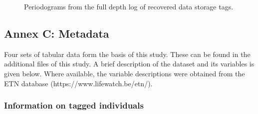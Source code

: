 \documentclass[
  authoryear,
  review,
  3p]{elsarticle}
\begin{document}
\begin{figure}

\begin{minipage}[t]{\linewidth}

{\centering 


}

\end{minipage}%
\newline
\begin{minipage}[t]{\linewidth}

{\centering 


}

\end{minipage}%

\caption{\label{fig-fft}Periodograms from the full depth log of
recovered data storage tags.}

\end{figure}

\newpage{}

\hypertarget{annex-c-metadata}{%
\subsection*{\texorpdfstring{\textbf{Annex C}:
Metadata}{Annex C: Metadata}}\label{annex-c-metadata}}

Four sets of tabular data form the basis of this study. These can be
found in the additional files of this study. A brief description of the
dataset and its variables is given below. Where available, the variable
descriptions were obtained from the ETN database
(https://www.lifewatch.be/etn/).

\hypertarget{information-on-tagged-individuals}{%
\subsubsection*{Information on tagged
individuals}\label{information-on-tagged-individuals}}
\end{document}
